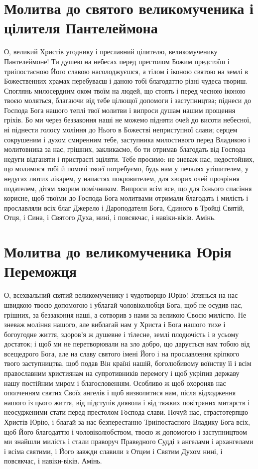 \documentclass[chapters.tex]{subfiles}
\begin{document}
\section{Молитва до святого великомученика і цілителя Пантелеймона}
О, великий Христів угоднику і преславний цілителю, великомученику Пантелеймоне! Ти душею на небесах перед престолом Божим предстоїш і триіпостасною Його славою насолоджуєшся, а тілом і іконою святою на землі в Божественних храмах перебуваєш і даною тобі благодаттю різні чудеса твориш. Споглянь милосердним оком твоїм на людей, що стоять і перед чесною іконою твоєю моляться, благаючи від тебе цілющої допомоги і заступництва; піднеси до Господа Бога нашого теплі твої молитви і випроси душам нашим прощення гріхів. Бо ми через беззаконня наші не можемо підняти очей до висоти небесної, ні піднести голосу моління до Нього в Божестві неприступної слави; серцем сокрушеним і духом смиренним тебе, заступника милостивого перед Владикою і молитовника за нас, грішних, закликаємо, бо ти отримав благодать від Господа недуги відганяти і пристрасті зціляти. Тебе просимо: не зневаж нас, недостойних, що молимося тобі й помочі твоєї потребуємо, будь нам у печалях утішителем, у недугах лютих лікарем, у напастях покровителем, для хворих очей прозріння подателем, дітям хворим помічником. Випроси всім все, що для їхнього спасіння корисне, щоб твоїми до Господа Бога молитвами отримали благодать і милість і прославляли всіх благ Джерело і Дароподателя Бога, Єдиного в Тройці Святій, Отця, і Сина, і Святого Духа, нині, і повсякчас, і навіки-віків. Амінь.

\section{Молитва до великомученика Юрія Переможця}
О, всехвальний святий великомученику і чудотворцю Юрію! Зглянься на нас швидкою твоєю допомогою і ублагай чоловіколюбця Бога, щоб не осудив нас, грішних, за беззаконня наші, а сотворив з нами за великою Своєю милістю. Не зневаж моління нашого, але виблагай нам у Христа і Бога нашого тихе і богоугодне життя, здоров’я ж душевне і тілесне, землі плодючість і в усьому достаток; і щоб ми не перетворювали на зло добро, що дарується нам тобою від всещедрого Бога, але на славу святого імені Його і на прославлення кріпкого твого заступництва, щоб подав Він країні нашій, боголюбивому воїнству її і всім православним християнам на супротивників перемогу і щоб укріпив державу нашу постійним миром і благословенням. Особливо ж щоб охороняв нас ополченням святих Своїх ангелів і щоб визволитися нам, після відходження нашого із цього життя, від підступів диявола і від тяжких повітряних митарств і неосудженими стати перед престолом Господа слави. Почуй нас, страстотерпцю Христів Юрію, і благай за нас безперестанно Триіпостасного Владику Бога всіх, щоб Його благодаттю і чоловіколюбством, твоєю ж допомогою і заступництвом ми знайшли милість і стали праворуч Праведного Судді з ангелами і архангелами і всіма святими, і Його завжди славили з Отцем і Святим Духом нині, і повсякчас, і навіки-віків. Амінь.
\end{document}
